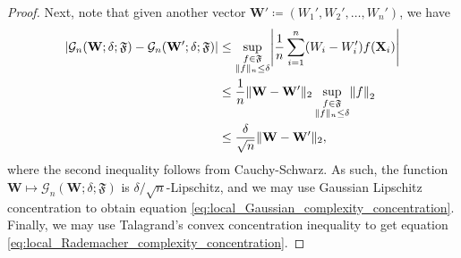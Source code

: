 \documentclass[11pt]{article}
\newcommand{\bW}{\mathbf{W}}
\newcommand{\bX}{\mathbf{X}}
\DeclarePairedDelimiter{\paren}{(}{)}
\DeclarePairedDelimiter{\abs}{|}{|}
\DeclarePairedDelimiter{\norm}{\|}{\|}
\newcommand{\nsamples}{n}
\newcommand{\funcclass}{\mathfrak{F}}
\begin{document}
\begin{proof}
    Next, note that given another vector $\bW' \coloneqq (W_1',W_2',\ldots,W_n')$, we have
    \begin{equation}
    \begin{split}
        \abs*{\mathcal{G}_n(\bW; \delta;\funcclass) - \mathcal{G}_n(\bW'; \delta;\funcclass)} & \leq \sup_{\substack{f \in \funcclass \\ \norm{f}_n \leq \delta}} \abs*{\frac{1}{n}\sum_{i=1}^n \paren*{W_i - W_i'}f(\bX_i)} \\
        & \leq \frac{1}{n}\norm{\bW - \bW'}_2 \sup_{\substack{f \in \funcclass \\ \norm{f}_n \leq \delta}} \norm*{f}_2 \\
        & \leq \frac{\delta}{\sqrt{\nsamples}} \norm{\bW - \bW'}_2,
    \end{split}
    \end{equation}
    where the second inequality follows from Cauchy-Schwarz.
    As such, the function $\bW \mapsto \mathcal{G}_n(\bW; \delta;\funcclass)$ is $\delta/\sqrt{\nsamples}$-Lipschitz, and we may use Gaussian Lipschitz concentration \citep{wainwright2019high} to obtain equation \eqref{eq:local_Gaussian_complexity_concentration}.
    Finally, we may use Talagrand's convex concentration inequality \citep{talagrand1995concentration} to get equation \eqref{eq:local_Rademacher_complexity_concentration}.
\end{proof}
\end{document}
